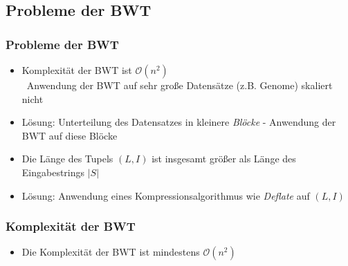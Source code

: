 \documentclass[14pt,xcolor=dvipsnames,pdftex]{beamer}
\begin{document}
\subsection{Probleme der BWT}
\begin{frame}[allowframebreaks]
 \frametitle{Probleme der BWT}
 \begin{itemize}
  \item Komplexität der BWT ist $\mathcal{O}(n^2)$\\
    \textrightarrow \ Anwendung der BWT auf sehr große Datensätze (z.B. Genome) skaliert nicht
    \pause
  \item Lösung: Unterteilung des Datensatzes in kleinere \textit{Blöcke} - Anwendung der BWT auf diese Blöcke
 \end{itemize}
 
\framebreak
 \begin{itemize}
  \item Die Länge des Tupels $(L,I)$ ist insgesamt größer als Länge des Eingabestrings $|S|$
  \pause
  \item Lösung: Anwendung eines Kompressionsalgorithmus wie \textit{Deflate} auf $(L,I)$
  \end{itemize}
\end{frame}
\begin{frame}
 \frametitle{Komplexität der BWT}
 \begin{itemize}
  \item Die Komplexität der BWT ist mindestens $\mathcal{O}(n^2)$
 \end{itemize}
\end{frame}
\end{document}
